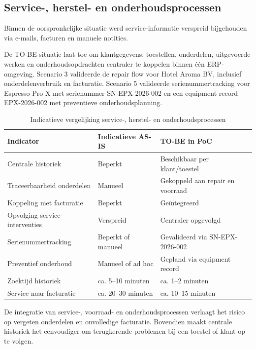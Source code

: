 \subsection{Service-, herstel- en onderhoudsprocessen}

Binnen de oorspronkelijke situatie werd service-informatie verspreid bijgehouden via e-mails, facturen en manuele notities.

De TO-BE-situatie laat toe om klantgegevens, toestellen, onderdelen, uitgevoerde werken en onderhoudsopdrachten centraler te koppelen binnen één ERP-omgeving. Scenario 3 valideerde de repair flow voor Hotel Aroma BV, inclusief onderdelenverbruik en facturatie. Scenario 5 valideerde serienummertracking voor Espresso Pro X met serienummer SN-EPX-2026-002 en een equipment record EPX-2026-002 met preventieve onderhoudsplanning.

\begin{table}[H]
\centering
\caption{Indicatieve vergelijking service-, herstel- en onderhoudsprocessen}
\label{tab:servicevergelijking}
\begin{tabular}{|p{5cm}|p{3cm}|p{3cm}|}
\hline
\textbf{Indicator} & \textbf{Indicatieve AS-IS} & \textbf{TO-BE in PoC} \\
\hline
Centrale historiek & Beperkt & Beschikbaar per klant/toestel \\
\hline
Traceerbaarheid onderdelen & Manueel & Gekoppeld aan repair en voorraad \\
\hline
Koppeling met facturatie & Beperkt & Geïntegreerd \\
\hline
Opvolging service-interventies & Verspreid & Centraler opgevolgd \\
\hline
Serienummertracking & Beperkt of manueel & Gevalideerd via SN-EPX-2026-002 \\
\hline
Preventief onderhoud & Manueel of ad hoc & Gepland via equipment record \\
\hline
Zoektijd historiek & ca. 5--10 minuten & ca. 1--2 minuten \\
\hline
Service naar facturatie & ca. 20--30 minuten & ca. 10--15 minuten \\
\hline
\end{tabular}
\end{table}

De integratie van service-, voorraad- en onderhoudsprocessen verlaagt het risico op vergeten onderdelen en onvolledige facturatie. Bovendien maakt centrale historiek het eenvoudiger om terugkerende problemen bij een toestel of klant op te volgen.

